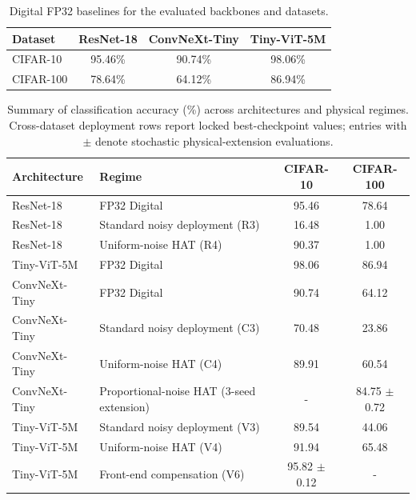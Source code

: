 \begin{table}[ht]
    \centering
    \caption{Digital FP32 baselines for the evaluated backbones and datasets.}
    \label{tab:supp-fp32-baselines}
    \begin{tabular}{lccc}
        \toprule
        \textbf{Dataset} & \textbf{ResNet-18} & \textbf{ConvNeXt-Tiny} & \textbf{Tiny-ViT-5M} \\
        \midrule
        CIFAR-10 & 95.46\% & 90.74\% & 98.06\% \\
        CIFAR-100 & 78.64\% & 64.12\% & 86.94\% \\
        \bottomrule
    \end{tabular}
\end{table}

\begin{table}[ht]
    \centering
    \caption{Summary of classification accuracy (\%) across architectures and physical regimes. Cross-dataset deployment rows report locked best-checkpoint values; entries with $\pm$ denote stochastic physical-extension evaluations.}
    \label{tab:supp-result-summary}
    \small
    \begin{tabular}{llcc}
        \toprule
        \textbf{Architecture} & \textbf{Regime} & \textbf{CIFAR-10} & \textbf{CIFAR-100} \\
        \midrule
        ResNet-18 & FP32 Digital & 95.46 & 78.64 \\
        ResNet-18 & Standard noisy deployment (R3) & 16.48 & 1.00 \\
        ResNet-18 & Uniform-noise HAT (R4) & 90.37 & 1.00 \\
        Tiny-ViT-5M & FP32 Digital & 98.06 & 86.94 \\
        ConvNeXt-Tiny & FP32 Digital & 90.74 & 64.12 \\
        ConvNeXt-Tiny & Standard noisy deployment (C3) & 70.48 & 23.86 \\
        ConvNeXt-Tiny & Uniform-noise HAT (C4) & 89.91 & 60.54 \\
        ConvNeXt-Tiny & Proportional-noise HAT (3-seed extension) & - & 84.75 $\pm$ 0.72 \\
        \midrule
        Tiny-ViT-5M & Standard noisy deployment (V3) & 89.54 & 44.06 \\
        Tiny-ViT-5M & Uniform-noise HAT (V4) & 91.94 & 65.48 \\
        Tiny-ViT-5M & Front-end compensation (V6) & 95.82 $\pm$ 0.12 & - \\
        \bottomrule
    \end{tabular}
\end{table}

